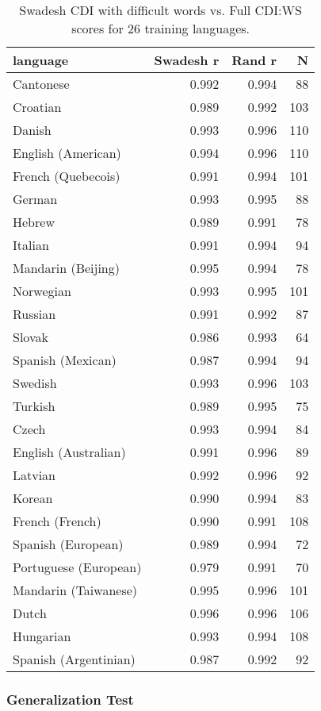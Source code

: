 \documentclass[
]{article}
\begin{document}
\begin{table}[H]
\centering
\begin{tabular}{lrrr}
  \hline
language & Swadesh r & Rand r & N \\ 
  \hline
Cantonese & 0.992 & 0.994 &   88 \\ 
  Croatian & 0.989 & 0.992 &  103 \\ 
  Danish & 0.993 & 0.996 &  110 \\ 
  English (American) & 0.994 & 0.996 &  110 \\ 
  French (Quebecois) & 0.991 & 0.994 &  101 \\ 
  German & 0.993 & 0.995 &   88 \\ 
  Hebrew & 0.989 & 0.991 &   78 \\ 
  Italian & 0.991 & 0.994 &   94 \\ 
  Mandarin (Beijing) & 0.995 & 0.994 &   78 \\ 
  Norwegian & 0.993 & 0.995 &  101 \\ 
  Russian & 0.991 & 0.992 &   87 \\ 
  Slovak & 0.986 & 0.993 &   64 \\ 
  Spanish (Mexican) & 0.987 & 0.994 &   94 \\ 
  Swedish & 0.993 & 0.996 &  103 \\ 
  Turkish & 0.989 & 0.995 &   75 \\ 
  Czech & 0.993 & 0.994 &   84 \\ 
  English (Australian) & 0.991 & 0.996 &   89 \\ 
  Latvian & 0.992 & 0.996 &   92 \\ 
  Korean & 0.990 & 0.994 &   83 \\ 
  French (French) & 0.990 & 0.991 &  108 \\ 
  Spanish (European) & 0.989 & 0.994 &   72 \\ 
  Portuguese (European) & 0.979 & 0.991 &   70 \\ 
  Mandarin (Taiwanese) & 0.995 & 0.996 &  101 \\ 
  Dutch & 0.996 & 0.996 &  106 \\ 
  Hungarian & 0.993 & 0.994 &  108 \\ 
  Spanish (Argentinian) & 0.987 & 0.992 &   92 \\ 
   \hline
\end{tabular}
\caption{Swadesh CDI with difficult words vs. Full CDI:WS scores for 26 training languages.} 
\end{table}

\hypertarget{generalization-test}{%
\subsubsection{Generalization Test}\label{generalization-test}}
\end{document}
